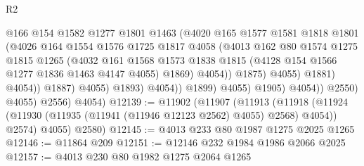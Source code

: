 \begin{lexlean}{R2}
\begin{coremodule}
                                        @166
                                        @154
                                        @1582
                                        @1277
                                        @1801
                                        @1463
                                        (@4020
                                          @165
                                          @1577
                                          @1581
                                          @1818
                                          @1801
                                          (@4026
                                            @164
                                            @1554
                                            @1576
                                            @1725
                                            @1817
                                            @4058
                                            (@4013
                                              @162
                                              @80
                                              @1574
                                              @1275
                                              @1815
                                              @1265
                                              (@4032
                                                @161
                                                @1568
                                                @1573
                                                @1838
                                                @1815
                                                (@4128 @154 @1566 @1277 @1836 @1463 @4147 @4055)
                                                @1869)
                                              @4054))
                                          @1875)
                                        @4055)
                                      @1881)
                                    @4054))
                                @1887)
                              @4055)
                            @1893)
                          @4054))
                      @1899)
                    @4055)
                  @1905)
                @4054))
            @2550)
          @4055)
        @2556)
      @4054)
@12139 := @11902
    (@11907
      (@11913
        (@11918 (@11924 (@11930 (@11935 (@11941 (@11946 @12123 @2562) @4055) @2568) @4054)) @2574)
        @4055)
      @2580)
@12145 := @4013 @233 @80 @1987 @1275 @2025 @1265
@12146 := @11864 @209
@12151 := @12146 @232 @1984 @1986 @2066 @2025
@12157 := @4013 @230 @80 @1982 @1275 @2064 @1265

\end{coremodule}
\end{lexlean}
